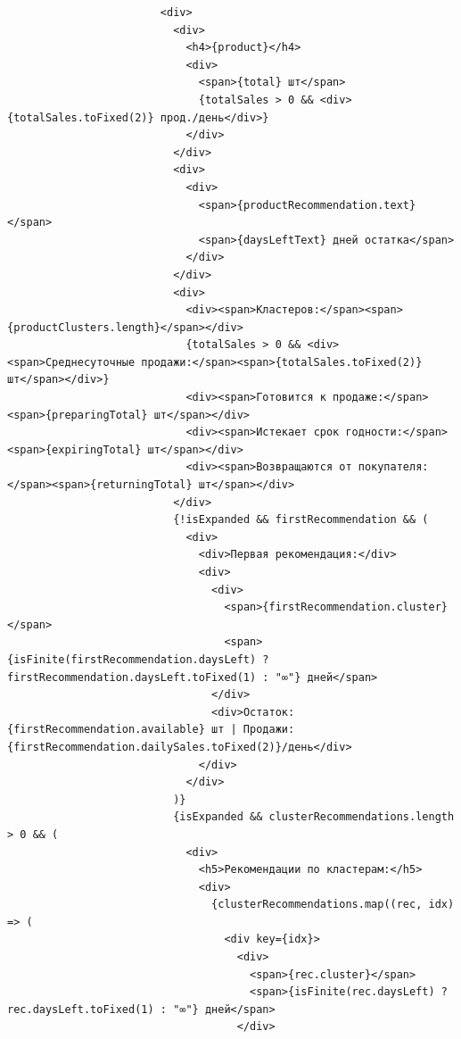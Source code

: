\begin{code}
\begin{verbatim}
                        <div>
                          <div>
                            <h4>{product}</h4>
                            <div>
                              <span>{total} шт</span>
                              {totalSales > 0 && <div>{totalSales.toFixed(2)} прод./день</div>}
                            </div>
                          </div>
                          <div>
                            <div>
                              <span>{productRecommendation.text}</span>
                              <span>{daysLeftText} дней остатка</span>
                            </div>
                          </div>
                          <div>
                            <div><span>Кластеров:</span><span>{productClusters.length}</span></div>
                            {totalSales > 0 && <div><span>Среднесуточные продажи:</span><span>{totalSales.toFixed(2)} шт</span></div>}
                            <div><span>Готовится к продаже:</span><span>{preparingTotal} шт</span></div>
                            <div><span>Истекает срок годности:</span><span>{expiringTotal} шт</span></div>
                            <div><span>Возвращаются от покупателя:</span><span>{returningTotal} шт</span></div>
                          </div>
                          {!isExpanded && firstRecommendation && (
                            <div>
                              <div>Первая рекомендация:</div>
                              <div>
                                <div>
                                  <span>{firstRecommendation.cluster}</span>
                                  <span>{isFinite(firstRecommendation.daysLeft) ? firstRecommendation.daysLeft.toFixed(1) : "∞"} дней</span>
                                </div>
                                <div>Остаток: {firstRecommendation.available} шт | Продажи: {firstRecommendation.dailySales.toFixed(2)}/день</div>
                              </div>
                            </div>
                          )}
                          {isExpanded && clusterRecommendations.length > 0 && (
                            <div>
                              <h5>Рекомендации по кластерам:</h5>
                              <div>
                                {clusterRecommendations.map((rec, idx) => (
                                  <div key={idx}>
                                    <div>
                                      <span>{rec.cluster}</span>
                                      <span>{isFinite(rec.daysLeft) ? rec.daysLeft.toFixed(1) : "∞"} дней</span>
                                    </div>

\end{verbatim}
\end{code}
